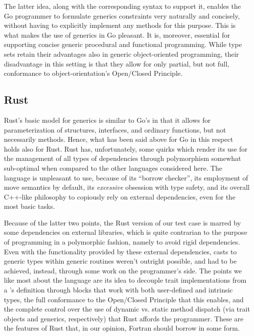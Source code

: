 \documentclass[11pt,oneside]{report}
\newcommand{\code}[1]{{\selectfont\ttfamily{#1}}}
\begin{document}
The latter idea, along with the corresponding syntax to support it,
enables the Go programmer to formulate generics constraints very
naturally and concisely, without having to explicitly implement any
methods for this purpose. This is what makes the use of generics in Go
pleasant. It is, moreover, essential for supporting concise generic
procedural and functional programming. While type sets retain their
advantages also in generic object-oriented programming, their
disadvantage in this setting is that they allow for only partial, but
not full, conformance to object-orientation's Open/Closed Principle.


\subsection{Rust}

Rust's basic model for generics is similar to Go's in that it allows
for parameterization of structures, interfaces, and ordinary
functions, but not necessarily methods. Hence, what has been said
above for Go in this respect holds also for Rust. Rust has,
unfortunately, some quirks which render its use for the management of
all types of dependencies through polymorphism somewhat sub-optimal
when compared to the other languages considered here. The language is
unpleasant to use, because of its ``borrow checker'', its employment
of move semantics by default, its \emph{excessive} obsession with type
safety, and its overall C++-like philosophy to copiously rely on
external dependencies, even for the most basic tasks.

Because of the latter two points, the Rust version of our test case is
marred by some dependencies on external libraries, which is quite
contrarian to the purpose of programming in a polymorphic fashion,
namely to avoid rigid dependencies. Even with the functionality
provided by these external dependencies, casts to generic types within
generic routines weren't outright possible, and had to be achieved,
instead, through some work on the programmer's side. The points we
like most about the language are its idea to decouple trait
implementations from a \code{struct}'s definition through \code{impl}
blocks that work with both user-defined and intrinsic types, the full
conformance to the Open/Closed Principle that this enables, and the
complete control over the use of dynamic vs. static method dispatch
(via trait objects and generics, respectively) that Rust affords the
programmer. These are the features of Rust that, in our opinion,
Fortran should borrow in some form.
\end{document}
